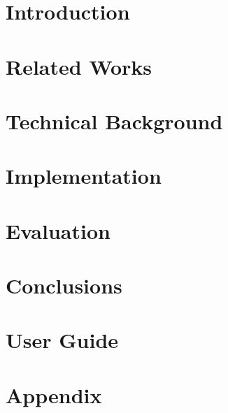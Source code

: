 



\listoftodos



\pagebreak

\chapter{Introduction}



\chapter{Related Works}

\label{sec:prior-research}

% 

\chapter{Technical Background}


\chapter{Implementation}


\chapter{Evaluation}


\chapter{Conclusions}


\chapter{User Guide}


\printbibliography

\appendix
\chapter{Appendix}



\printglossary[type=\acronymtype] %
\printglossary


